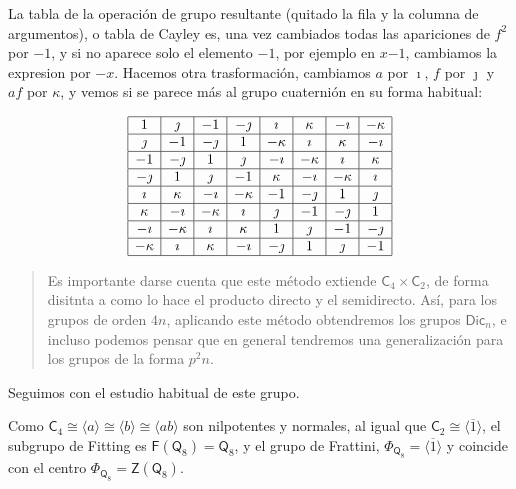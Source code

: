 \documentclass[12pt,a4paper,fleqn,spanish,final,openright]{extbook}
\theoremstyle{definition}
\theoremstyle{remark}
\begin{document}
	La tabla de la operación de grupo resultante (quitado la fila y la columna de argumentos), o tabla de Cayley es, una vez cambiados todas las apariciones de $f^2$ por ${-1}$, y si no aparece solo el elemento ${-1}$, por ejemplo en $x{-1}$, cambiamos la expresion por ${-x}$. Hacemos otra trasformación, cambiamos $a$ por $\imath$, $f$ por $\jmath$ y $af$ por $\kappa$, y vemos si se parece más al grupo cuaternión en su forma habitual:


\begin{align*}
\begin{array}{|c|c|c|c|c|c|c|c|}
\hline
1&{\jmath}&{-1}&{-{\jmath}}&{\imath}&{\kappa}&{-{\imath}}&{-{\kappa}}\\
\hline
{\jmath}&{-1}&{-{\jmath}}&1&{-{\kappa}}&{\imath}&{\kappa}&{-{\imath}}\\
\hline
{-1}&{-{\jmath}}&1&{\jmath}&{-{\imath}}&{-{\kappa}}&{\imath}&{\kappa}\\
\hline
{-{\jmath}}&1&{\jmath}&{-1}&{\kappa}&{-{\imath}}&{-{\kappa}}&{\imath}\\
\hline
{\imath}&{\kappa}&{-{\imath}}&{-{\kappa}}&{-1}&{-{\jmath}}&1&{\jmath}\\
\hline
{\kappa}&{-{\imath}}&{-{\kappa}}&{\imath}&{\jmath}&{-1}&{-{\jmath}}&1\\
\hline
{-{\imath}}&{-{\kappa}}&{\imath}&{\kappa}&1&{\jmath}&{-1}&{-{\jmath}}\\
\hline
{-{\kappa}}&{\imath}&{\kappa}&{-{\imath}}&{-{\jmath}}&1&{\jmath}&{-1}\\
\hline
\end{array}
\end{align*}

	\begin{quote}
		Es importante darse cuenta que este método extiende $\mathsf{C}_{4}\times\mathsf{C}_{2}$, de forma disitnta a como lo hace el producto directo y el semidirecto. Así, para los grupos de orden $4n$, aplicando este método obtendremos los grupos $\mathsf{Dic}_{n}$, e incluso podemos pensar que en general tendremos una generalización para los grupos de la forma $p^2 n$.
	\end{quote}	
	
	
		
	Seguimos con el estudio habitual de este grupo.	
     
    Como $\mathsf{C}_{4}\cong\langle a\rangle\cong\langle b\rangle\cong\langle ab\rangle$ son nilpotentes y normales, al igual que $\mathsf{C}_{2}\cong\langle\overline{1}\rangle$, el subgrupo de Fitting es $\mathsf{F}(\mathsf{Q}_8)=\mathsf{Q}_8$, y el grupo de Frattini, $\Phi_{\mathsf{Q}_8}=\langle \overline{1}\rangle$ y coincide con el centro $\Phi_{\mathsf{Q}_8}=\mathsf{Z}(\mathsf{Q}_8)$.
    
\end{document}
